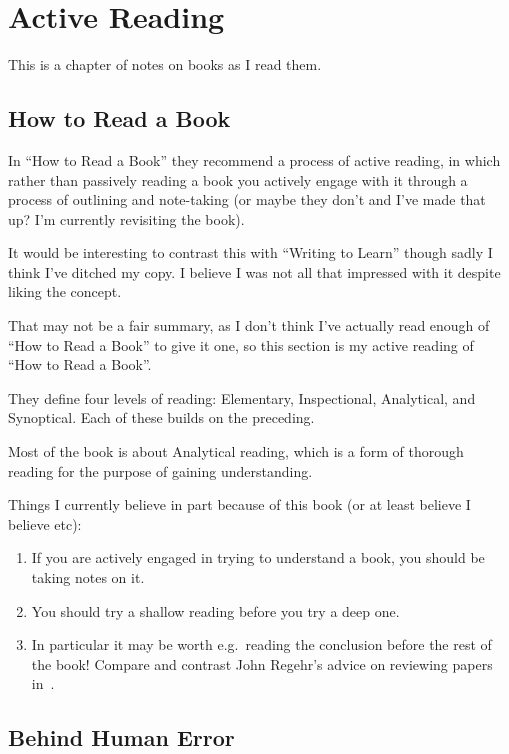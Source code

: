 \chapter{Active Reading}

This is a chapter of notes on books as I read them.

\section{How to Read a Book}

In ``How to Read a Book''\cite{ReadABook} they recommend a process of active reading,
in which rather than passively reading a book you actively engage with it through a process of outlining and note-taking (or maybe they don't and I've made that up? I'm currently revisiting the book).

It would be interesting to contrast this with ``Writing to Learn''\cite{WritingToLearn} though sadly I think I've ditched my copy.
I believe I was not all that impressed with it despite liking the concept.

That may not be a fair summary, as I don't think I've actually read enough of ``How to Read a Book'' to give it one,
so this section is my active reading of ``How to Read a Book''.

They define four levels of reading:
Elementary, Inspectional, Analytical, and Synoptical.
Each of these builds on the preceding.

Most of the book is about Analytical reading,
which is a form of thorough reading for the purpose of gaining understanding.

Things I currently believe in part because of this book (or at least believe I believe etc):

\begin{enumerate}
\item If you are actively engaged in trying to understand a book, you should be taking notes on it.
\item You should try a shallow reading before you try a deep one.
\item In particular it may be worth e.g.\ reading the conclusion before the rest of the book!
Compare and contrast John Regehr's advice on reviewing papers in~\cite{ReviewingPapers}.
\end{enumerate}

\section{Behind Human Error}

